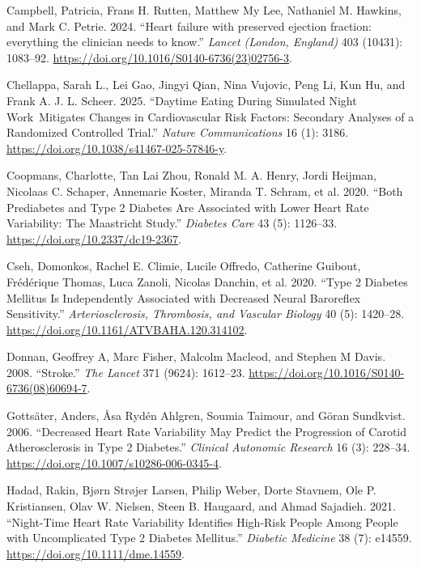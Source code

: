 \documentclass[
  a4paper,
  headsepline=true,
  open=any]{scrbook}
\newlength{\cslhangindent}
\newlength{\cslentryspacingunit} %
\newenvironment{CSLReferences}[2] %
 {%
  \setlength{\parindent}{0pt}
  \ifodd #1
  \let\oldpar\par
  \def\par{\hangindent=\cslhangindent\oldpar}
  \fi
  \setlength{\parskip}{#2\cslentryspacingunit}
 }%
 {}
\begin{document}
\begin{CSLReferences}{1}{0}
\leavevmode{}%
Campbell, Patricia, Frans H. Rutten, Matthew My Lee, Nathaniel M.
Hawkins, and Mark C. Petrie. 2024. {``Heart failure with preserved
ejection fraction: everything the clinician needs to know.''}
\emph{Lancet (London, England)} 403 (10431): 1083--92.
\url{https://doi.org/10.1016/S0140-6736(23)02756-3}.

\leavevmode{}%
Chellappa, Sarah L., Lei Gao, Jingyi Qian, Nina Vujovic, Peng Li, Kun
Hu, and Frank A. J. L. Scheer. 2025. {``Daytime Eating During Simulated
Night Work~Mitigates Changes in Cardiovascular Risk Factors: Secondary
Analyses of a Randomized Controlled Trial.''} \emph{Nature
Communications} 16 (1): 3186.
\url{https://doi.org/10.1038/s41467-025-57846-y}.

\leavevmode{}%
Coopmans, Charlotte, Tan Lai Zhou, Ronald M. A. Henry, Jordi Heijman,
Nicolaas C. Schaper, Annemarie Koster, Miranda T. Schram, et al. 2020.
{``Both Prediabetes and Type 2 Diabetes Are Associated with Lower Heart
Rate Variability: The Maastricht Study.''} \emph{Diabetes Care} 43 (5):
1126--33. \url{https://doi.org/10.2337/dc19-2367}.

\leavevmode{}%
Cseh, Domonkos, Rachel E. Climie, Lucile Offredo, Catherine Guibout,
Frédérique Thomas, Luca Zanoli, Nicolas Danchin, et al. 2020. {``Type 2
Diabetes Mellitus Is Independently Associated with Decreased Neural
Baroreflex Sensitivity.''} \emph{Arteriosclerosis, Thrombosis, and
Vascular Biology} 40 (5): 1420--28.
\url{https://doi.org/10.1161/ATVBAHA.120.314102}.

\leavevmode{}%
Donnan, Geoffrey A, Marc Fisher, Malcolm Macleod, and Stephen M Davis.
2008. {``Stroke.''} \emph{The Lancet} 371 (9624): 1612--23.
\url{https://doi.org/10.1016/S0140-6736(08)60694-7}.

\leavevmode{}%
Gottsäter, Anders, Åsa Rydén Ahlgren, Soumia Taimour, and Göran
Sundkvist. 2006. {``Decreased Heart Rate Variability May Predict the
Progression of Carotid Atherosclerosis in Type 2 Diabetes.''}
\emph{Clinical Autonomic Research} 16 (3): 228--34.
\url{https://doi.org/10.1007/s10286-006-0345-4}.

\leavevmode{}%
Hadad, Rakin, Bjørn Strøjer Larsen, Philip Weber, Dorte Stavnem, Ole P.
Kristiansen, Olav W. Nielsen, Steen B. Haugaard, and Ahmad Sajadieh.
2021. {``Night-Time Heart Rate Variability Identifies High-Risk People
Among People with Uncomplicated Type 2 Diabetes Mellitus.''}
\emph{Diabetic Medicine} 38 (7): e14559.
\url{https://doi.org/10.1111/dme.14559}.


\end{CSLReferences}
\end{document}
